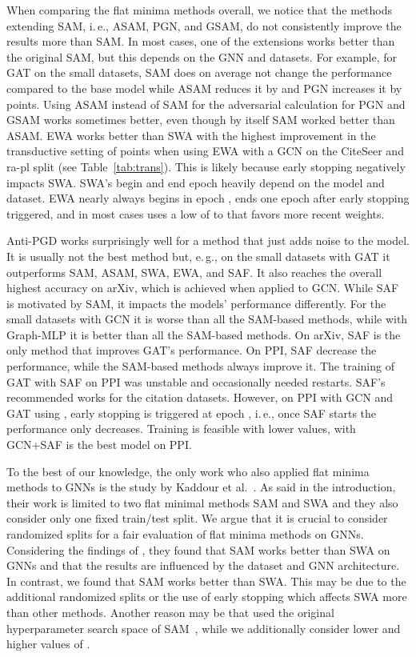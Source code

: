 \documentclass[runningheads]{llncs}
\newcommand{\ie}{i.\,e.,\xspace}
\newcommand{\eg}{e.\,g.,\xspace}
\newcommand{\GraphMLP}{Graph-MLP\xspace}
\begin{document}
When comparing the flat minima methods overall, we notice that the methods extending SAM, \ie ASAM, PGN, and GSAM, do not consistently improve the results more than SAM. 
In most cases, one of the extensions works better than the original SAM, but this depends on the GNN and datasets.
For example, for GAT on the small datasets, SAM does on average not change the performance compared to the base model while ASAM reduces it by  and PGN increases it by  points.
Using ASAM instead of SAM for the adversarial calculation for PGN and GSAM works sometimes better, even though by itself SAM worked better than ASAM.
EWA works better than SWA with the highest improvement in the transductive setting of  points when using EWA with a GCN on the CiteSeer and ra-pl split (see Table~\ref{tab:trans}).
This is likely because early stopping negatively impacts SWA.
SWA's begin and end epoch heavily depend on the model and dataset.
EWA nearly always begins in epoch , ends one epoch after early stopping triggered, and in most cases uses a low  of  to  that favors more recent weights.

Anti-PGD works surprisingly well for a method that just adds noise to the model.
It is usually not the best method but, \eg on the small datasets with GAT it outperforms SAM, ASAM, SWA, EWA, and SAF.
It also reaches the overall highest accuracy on arXiv, which is achieved when applied to GCN.
While SAF is motivated by SAM, it impacts the models' performance differently.
For the small datasets with GCN it is worse than all the SAM-based methods, while with \GraphMLP it is better than all the SAM-based methods.
On arXiv, SAF is the only method that improves GAT's performance.
On PPI, SAF decrease the performance, while the SAM-based methods always improve it. 
The training of GAT with SAF on PPI was unstable and occasionally needed restarts.
SAF's recommended  works for the citation datasets.
However, on PPI with GCN and GAT using , early stopping is triggered at epoch , \ie once SAF starts the performance only decreases.
Training is feasible with lower values, with  GCN+SAF is the best model on PPI.

To the best of our knowledge, the only work who also applied flat minima methods to GNNs is the study by Kaddour et al.~\cite{Shchur18pitfalls}.
As said in the introduction, their work is limited to two flat minimal methods SAM and SWA and they also consider only one fixed train/test split.
We argue that it is crucial to consider randomized splits for a fair evaluation of flat minima methods on GNNs.
Considering the findings of \cite{kaddour2022questions}, they found that SAM works better than SWA on GNNs and that the results are influenced by the dataset and GNN architecture.
In contrast, we found that SAM works better than SWA.
This may be due to the additional randomized splits or the use of early stopping which affects SWA more than other methods.
Another reason may be that \cite{kaddour2022questions} used the original hyperparameter search space of SAM~\cite{Foret21sharpness}, while we additionally consider lower and higher values of . 
\end{document}
